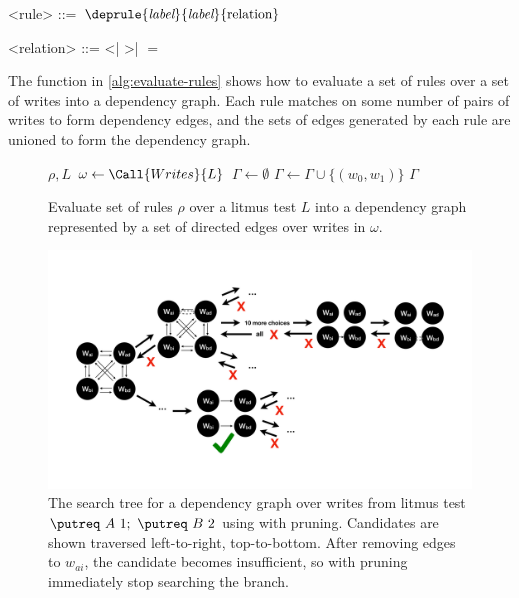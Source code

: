   \begin{grammar}
    <rule> ::= $\deprule{\textit{label}}{\textit{label}}{\text{relation}}$

    <relation> ::= \textless | \textgreater | $=$
  \end{grammar}

The function in \autoref{alg:evaluate-rules} shows how to evaluate a set of rules over
a set of writes into a dependency graph.
Each rule matches on some number of pairs of writes to form dependency edges,
and the sets of edges generated by each rule are unioned to form the
dependency graph.

\begin{figure}[h]
\begin{algorithmic}[1]
    {$\rho, L$} 
    \State $\omega \gets \Call{Writes}{L}$
    \State $\Gamma \gets \emptyset$ 
       
          \State $\Gamma \gets \Gamma \cup \{(w_0, w_1)\}$
        \EndIf
      \EndFor
    \EndFor
    \State \Return $\Gamma$
  \EndFunction
\end{algorithmic}
\caption{Evaluate set of rules $\rho$ over a litmus test $L$ into a dependency graph
represented by a set of directed edges over writes in $\omega$.\tighten}
\label{alg:evaluate-rules}
\end{figure}

\begin{figure}
  \centering
  \includegraphics[clip,trim=0cm 7cm 0cm 7cm,width=0.9\linewidth,page=3]{graph-search-graphics.pdf}
  \caption{The search tree for a dependency graph over writes from litmus test
           $ \putreq\ A\ 1;\ \putreq\ B\ 2$ using
           \sccsearch with pruning.
           Candidates are shown traversed left-to-right, top-to-bottom.
           After removing edges to $w_{ai}$, the candidate becomes insufficient,
           so \sccsearch with pruning immediately stop searching the branch.}
  \label{fig:pruning-search-visual}
\end{figure}

